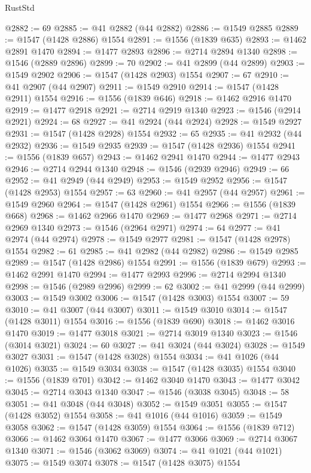 \begin{lexlean}{RustStd}
\begin{coremodule}
@2882 := 69
@2885 := @41 @2882 (@44 @2882)
@2886 := @1549 @2885
@2889 := @1547 (@1428 @2886) @1554
@2891 := @1556 (@1839 @635)
@2893 := @1462 @2891 @1470
@2894 := @1477 @2893
@2896 := @2714 @2894 @1340
@2898 := @1546 (@2889 @2896)
@2899 := 70
@2902 := @41 @2899 (@44 @2899)
@2903 := @1549 @2902
@2906 := @1547 (@1428 @2903) @1554
@2907 := 67
@2910 := @41 @2907 (@44 @2907)
@2911 := @1549 @2910
@2914 := @1547 (@1428 @2911) @1554
@2916 := @1556 (@1839 @646)
@2918 := @1462 @2916 @1470
@2919 := @1477 @2918
@2921 := @2714 @2919 @1340
@2923 := @1546 (@2914 @2921)
@2924 := 68
@2927 := @41 @2924 (@44 @2924)
@2928 := @1549 @2927
@2931 := @1547 (@1428 @2928) @1554
@2932 := 65
@2935 := @41 @2932 (@44 @2932)
@2936 := @1549 @2935
@2939 := @1547 (@1428 @2936) @1554
@2941 := @1556 (@1839 @657)
@2943 := @1462 @2941 @1470
@2944 := @1477 @2943
@2946 := @2714 @2944 @1340
@2948 := @1546 (@2939 @2946)
@2949 := 66
@2952 := @41 @2949 (@44 @2949)
@2953 := @1549 @2952
@2956 := @1547 (@1428 @2953) @1554
@2957 := 63
@2960 := @41 @2957 (@44 @2957)
@2961 := @1549 @2960
@2964 := @1547 (@1428 @2961) @1554
@2966 := @1556 (@1839 @668)
@2968 := @1462 @2966 @1470
@2969 := @1477 @2968
@2971 := @2714 @2969 @1340
@2973 := @1546 (@2964 @2971)
@2974 := 64
@2977 := @41 @2974 (@44 @2974)
@2978 := @1549 @2977
@2981 := @1547 (@1428 @2978) @1554
@2982 := 61
@2985 := @41 @2982 (@44 @2982)
@2986 := @1549 @2985
@2989 := @1547 (@1428 @2986) @1554
@2991 := @1556 (@1839 @679)
@2993 := @1462 @2991 @1470
@2994 := @1477 @2993
@2996 := @2714 @2994 @1340
@2998 := @1546 (@2989 @2996)
@2999 := 62
@3002 := @41 @2999 (@44 @2999)
@3003 := @1549 @3002
@3006 := @1547 (@1428 @3003) @1554
@3007 := 59
@3010 := @41 @3007 (@44 @3007)
@3011 := @1549 @3010
@3014 := @1547 (@1428 @3011) @1554
@3016 := @1556 (@1839 @690)
@3018 := @1462 @3016 @1470
@3019 := @1477 @3018
@3021 := @2714 @3019 @1340
@3023 := @1546 (@3014 @3021)
@3024 := 60
@3027 := @41 @3024 (@44 @3024)
@3028 := @1549 @3027
@3031 := @1547 (@1428 @3028) @1554
@3034 := @41 @1026 (@44 @1026)
@3035 := @1549 @3034
@3038 := @1547 (@1428 @3035) @1554
@3040 := @1556 (@1839 @701)
@3042 := @1462 @3040 @1470
@3043 := @1477 @3042
@3045 := @2714 @3043 @1340
@3047 := @1546 (@3038 @3045)
@3048 := 58
@3051 := @41 @3048 (@44 @3048)
@3052 := @1549 @3051
@3055 := @1547 (@1428 @3052) @1554
@3058 := @41 @1016 (@44 @1016)
@3059 := @1549 @3058
@3062 := @1547 (@1428 @3059) @1554
@3064 := @1556 (@1839 @712)
@3066 := @1462 @3064 @1470
@3067 := @1477 @3066
@3069 := @2714 @3067 @1340
@3071 := @1546 (@3062 @3069)
@3074 := @41 @1021 (@44 @1021)
@3075 := @1549 @3074
@3078 := @1547 (@1428 @3075) @1554

\end{coremodule}
\end{lexlean}
